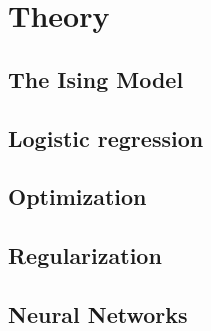 
\section{Theory}
\subsection{The Ising Model} \label{sec:ising-model}


\subsection{Logistic regression}


% 

\subsection{Optimization}


\subsection{Regularization}


\subsection{Neural Networks}

